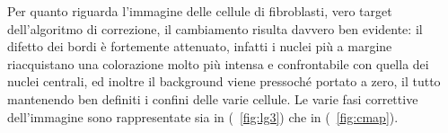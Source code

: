 Per quanto riguarda l'immagine delle cellule di fibroblasti, vero target dell'algoritmo di correzione, il cambiamento risulta davvero ben evidente: il difetto dei bordi è fortemente attenuato, infatti i nuclei più a margine riacquistano una colorazione molto più intensa e confrontabile con quella dei nuclei centrali, ed inoltre il background viene pressoché portato a zero, il tutto mantenendo ben definiti i confini delle varie cellule.
Le varie fasi correttive dell'immagine sono rappresentate sia in (\figurename~\ref{fig:lg3}) che in (\figurename~\ref{fig:cmap}).